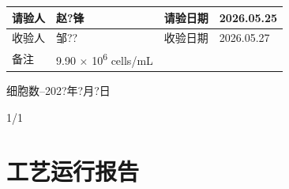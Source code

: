 \documentclass[UTF8,10pt,a4paper,fontset=fandol]{ctexart}
\newcommand{\fieldvalue}[1]{#1}
\newcommand{\handwritten}[1]{#1}
\begin{document}
\begin{tabularx}{\textwidth}{|p{2.6cm}|X|p{2.6cm}|X|}
请验人 &
\fieldvalue{\handwritten{赵?锋}} &
请验日期 &
\fieldvalue{\handwritten{2026.05.25}}
\\ \hline

收验人 &
\fieldvalue{\handwritten{邹??}} &
收验日期 &
\fieldvalue{\handwritten{2026.05.27}}
\\ \hline

备注 &
\fieldvalue{\handwritten{9.90 \(\times\) 10\textsuperscript{6} cells/mL}} &
\multicolumn{2}{l|}{}
\\ \hline
\end{tabularx}

\vspace{0.4cm}

\noindent\handwritten{细胞数--202?年?月?日}

\vfill

\begin{center}
\handwritten{1/1}
\end{center}

\newpage

\section*{工艺运行报告}
\end{document}
